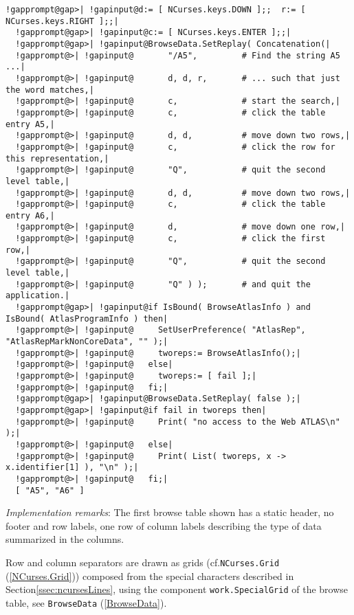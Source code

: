 \documentclass[a4paper,11pt]{report}
\begin{document}
{{{ 
\begin{Verbatim}[commandchars=!@|,fontsize=\small,frame=single,label=Example]
  !gapprompt@gap>| !gapinput@d:= [ NCurses.keys.DOWN ];;  r:= [ NCurses.keys.RIGHT ];;|
  !gapprompt@gap>| !gapinput@c:= [ NCurses.keys.ENTER ];;|
  !gapprompt@gap>| !gapinput@BrowseData.SetReplay( Concatenation(|
  !gapprompt@>| !gapinput@       "/A5",         # Find the string A5 ...|
  !gapprompt@>| !gapinput@       d, d, r,       # ... such that just the word matches,|
  !gapprompt@>| !gapinput@       c,             # start the search,|
  !gapprompt@>| !gapinput@       c,             # click the table entry A5,|
  !gapprompt@>| !gapinput@       d, d,          # move down two rows,|
  !gapprompt@>| !gapinput@       c,             # click the row for this representation,|
  !gapprompt@>| !gapinput@       "Q",           # quit the second level table,|
  !gapprompt@>| !gapinput@       d, d,          # move down two rows,|
  !gapprompt@>| !gapinput@       c,             # click the table entry A6,|
  !gapprompt@>| !gapinput@       d,             # move down one row,|
  !gapprompt@>| !gapinput@       c,             # click the first row,|
  !gapprompt@>| !gapinput@       "Q",           # quit the second level table,|
  !gapprompt@>| !gapinput@       "Q" ) );       # and quit the application.|
  !gapprompt@gap>| !gapinput@if IsBound( BrowseAtlasInfo ) and IsBound( AtlasProgramInfo ) then|
  !gapprompt@>| !gapinput@     SetUserPreference( "AtlasRep", "AtlasRepMarkNonCoreData", "" );|
  !gapprompt@>| !gapinput@     tworeps:= BrowseAtlasInfo();|
  !gapprompt@>| !gapinput@   else|
  !gapprompt@>| !gapinput@     tworeps:= [ fail ];|
  !gapprompt@>| !gapinput@   fi;|
  !gapprompt@gap>| !gapinput@BrowseData.SetReplay( false );|
  !gapprompt@gap>| !gapinput@if fail in tworeps then|
  !gapprompt@>| !gapinput@     Print( "no access to the Web ATLAS\n" );|
  !gapprompt@>| !gapinput@   else|
  !gapprompt@>| !gapinput@     Print( List( tworeps, x -> x.identifier[1] ), "\n" );|
  !gapprompt@>| !gapinput@   fi;|
  [ "A5", "A6" ]
\end{Verbatim}
 

 \emph{Implementation remarks}: The first browse table shown has a static header, no footer and row labels,
one row of column labels describing the type of data summarized in the
columns. 

 Row and column separators are drawn as grids (cf.{\nobreakspace}\texttt{NCurses.Grid} (\ref{NCurses.Grid})) composed from the special characters described in Section{\nobreakspace}\ref{ssec:ncursesLines}, using the component \texttt{work.SpecialGrid} of the browse table, see \texttt{BrowseData} (\ref{BrowseData}). 

}}}
\end{document}
